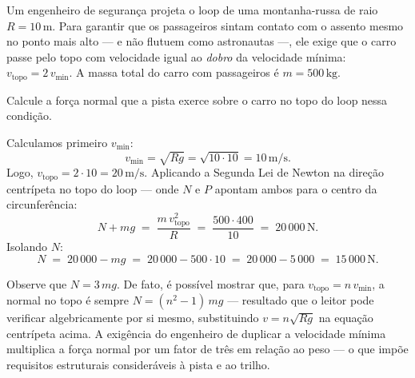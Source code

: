 \begin{exemplo}[Nível II]\label{exemplo_newton_vloopex02}

Um engenheiro de segurança projeta o loop de uma montanha-russa de raio $R = 10\,\text{m}$.
Para garantir que os passageiros sintam contato com o assento mesmo no ponto mais
alto --- e não flutuem como astronautas ---, ele exige que o carro passe pelo topo com
velocidade igual ao \emph{dobro} da velocidade mínima: $v_{\text{topo}} = 2\,v_\text{min}$.
A massa total do carro com passageiros é $m = 500\,\text{kg}$.
 
Calcule a força normal que a pista exerce sobre o carro no topo do loop nessa condição.

\resolucao
 
Calculamos primeiro $v_\text{min}$:
%
\[
    v_\text{min} = \sqrt{Rg} = \sqrt{10 \cdot 10} = 10\,\text{m/s.}
\]
%
Logo, $v_{\text{topo}} = 2 \cdot 10 = 20\,\text{m/s}$.
Aplicando a Segunda Lei de Newton na direção centrípeta no topo do loop ---
onde $N$ e $P$ apontam ambos para o centro da circunferência:
%
\[
    N + mg \;=\; \frac{m\,v_{\text{topo}}^{2}}{R}
           \;=\; \frac{500 \cdot 400}{10}
           \;=\; 20\,000\,\text{N.}
\]
%
Isolando $N$:
%
\[
    N \;=\; 20\,000 - mg
      \;=\; 20\,000 - 500 \cdot 10
      \;=\; 20\,000 - 5\,000
      \;=\; \boxed{15\,000\,\text{N.}}
\]
 
Observe que $N = 3\,mg$.
De fato, é possível mostrar que, para $v_{\text{topo}} = n\,v_\text{min}$, a normal no topo é
sempre $N = (n^{2} - 1)\,mg$ --- resultado que o leitor pode verificar
algebricamente por si mesmo, substituindo $v = n\sqrt{Rg}$ na equação centrípeta
acima.
A exigência do engenheiro de duplicar a velocidade mínima multiplica a força normal
por um fator de três em relação ao peso --- o que impõe requisitos estruturais
consideráveis à pista e ao trilho.




\end{exemplo}

\vspace{0.3cm}




